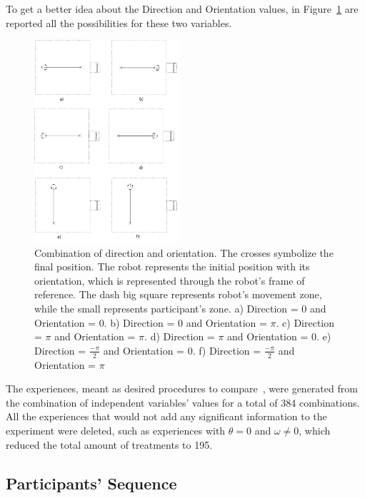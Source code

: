 To get a better idea about the Direction and Orientation values, in Figure~\ref{fig:possibilities_orientation_direction} are reported all the possibilities for these two variables.

\begin{figure}
	\centering
	\includegraphics[width=0.48\textwidth]{./Images/possibilities_case.png} 
	\caption{Combination of direction and orientation. The crosses symbolize the final position. The robot represents the initial position with its orientation, which is represented through the robot's frame of reference. The dash big square represents robot's movement zone, while the small represents participant's zone. a) Direction = $0$ and Orientation = $0$. b) Direction = $0$ and Orientation = $\pi$. c) Direction = $\pi$ and Orientation = $\pi$. d) Direction = $\pi$ and Orientation = $0$. e) Direction = $\frac{-\pi}{2}$ and Orientation = $0$. f) Direction = $\frac{-\pi}{2}$ and Orientation = $\pi$}
	\label{fig:possibilities_orientation_direction}
\end{figure}

The experiences, meant as desired procedures to compare~\cite{oehlert2000first}, were generated from the combination of independent variables' values for a total of 384 combinations. All the experiences that would not add any significant information to the experiment were deleted, such as experiences with $\theta=0$ and $\omega \neq 0$, which reduced the total amount of treatments to 195.

\subsection{Participants' Sequence}

